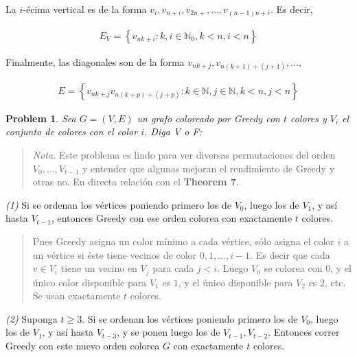 \documentclass[a4paper, 12pt]{article}
\newtheorem{problem}{Problem}
\newtheorem{problem}{Problem}
\begin{document}
La $i$-écima vertical es de la forma $v_{i}, v_{n + i}, v_{2n + }, \ldots,
v_{(n - 1)n + i}$. Es decir, 

\begin{align*}
    E_V = \left\{ v_{nk + i} : k, i \in \mathbb{N}_0, k < n, i < n \right\} 
\end{align*}

Finalmente, las diagonales son de la forma $v_{nk + j}, v_{n(k+1) + (j + 1)},
\ldots , $

\begin{align*}
    E = \left\{ v_{nk + j}v_{n(k+p) + (j + p)} : k \in \mathbb{N}, j \in
    \mathbb{N}, k < n, j < n \right\} 
\end{align*}

\pagebreak 

\begin{problem}
    Sea $G = (V, E) $ un grafo coloreado por Greedy con $t$ colores y $V_i$ el
    conjunto de colores con el color $i$. Diga V o F:
\end{problem}


\small
\begin{quote}

\textit{Nota.} Este problema es lindo para ver diversas permutaciones del orden
$V_0, \ldots, V_{t - 1}$ y entender que algunas mejoran el rendimiento de Greedy
y otras no. En directa relación con el \textbf{Theorem 7}.

\end{quote}
\normalsize


\textit{(1)} Si se ordenan los vértices poniendo primero los de $V_0$, luego los
de $V_1$, y así hasta $V_{t-1}$, entonces Greedy con ese orden colorea con
exactamente $t$ colores. 

\small
\begin{quote}
    Pues Greedy asigna un color mínimo a cada vértice, sólo asigna el color $i$
    a un vértice si éste tiene vecinos de color $0, 1, \ldots, i -1$. Es decir
    que cada $v \in V_i$ tiene un vecino en $V_j$ para cada $j < i$. Luego $V_0$
    se colorea con $0$, y el único color disponible para $V_1$ es $1$, y el
    único disponible para $V_2$ es $2$, etc. Se usan exactamente $t$ colores.
\end{quote}


\textit{(2)} Suponga $t \geq 3$. Si se ordenan los vértices poniendo primero los
de $V_0$, luego los de $V_1$, y así hasta $V_{t - 3}$, y se ponen luego los de
$V_{t - 1}, V_{t-2}$. Entonces correr Greedy con este nuevo orden colorea $G$
con exactamente $t$ colores.
\end{document}
